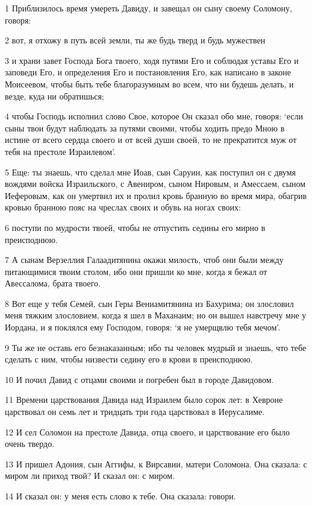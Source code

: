 \par 1 Приблизилось время умереть Давиду, и завещал он сыну своему Соломону, говоря:
\par 2 вот, я отхожу в путь всей земли, ты же будь тверд и будь мужествен
\par 3 и храни завет Господа Бога твоего, ходя путями Его и соблюдая уставы Его и заповеди Его, и определения Его и постановления Его, как написано в законе Моисеевом, чтобы быть тебе благоразумным во всем, что ни будешь делать, и везде, куда ни обратишься;
\par 4 чтобы Господь исполнил слово Свое, которое Он сказал обо мне, говоря: `если сыны твои будут наблюдать за путями своими, чтобы ходить предо Мною в истине от всего сердца своего и от всей души своей, то не прекратится муж от тебя на престоле Израилевом'.
\par 5 Еще: ты знаешь, что сделал мне Иоав, сын Саруин, как поступил он с двумя вождями войска Израильского, с Авениром, сыном Нировым, и Амессаем, сыном Иеферовым, как он умертвил их и пролил кровь бранную во время мира, обагрив кровью бранною пояс на чреслах своих и обувь на ногах своих:
\par 6 поступи по мудрости твоей, чтобы не отпустить седины его мирно в преисподнюю.
\par 7 А сынам Верзеллия Галаадитянина окажи милость, чтоб они были между питающимися твоим столом, ибо они пришли ко мне, когда я бежал от Авессалома, брата твоего.
\par 8 Вот еще у тебя Семей, сын Геры Вениамитянина из Бахурима; он злословил меня тяжким злословием, когда я шел в Маханаим; но он вышел навстречу мне у Иордана, и я поклялся ему Господом, говоря: `я не умерщвлю тебя мечом'.
\par 9 Ты же не оставь его безнаказанным; ибо ты человек мудрый и знаешь, что тебе сделать с ним, чтобы низвести седину его в крови в преисподнюю.
\par 10 И почил Давид с отцами своими и погребен был в городе Давидовом.
\par 11 Времени царствования Давида над Израилем было сорок лет: в Хевроне царствовал он семь лет и тридцать три года царствовал в Иерусалиме.
\par 12 И сел Соломон на престоле Давида, отца своего, и царствование его было очень твердо.
\par 13 И пришел Адония, сын Аггифы, к Вирсавии, матери Соломона. Она сказала: с миром ли приход твой? И сказал он: с миром.
\par 14 И сказал он: у меня есть слово к тебе. Она сказала: говори.
